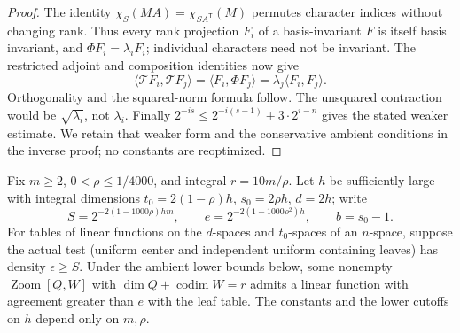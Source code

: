 \begin{proof}
The identity $\chi_S(MA)=\chi_{SA^{\mathsf T}}(M)$ permutes character
indices without changing rank. Thus every rank projection $F_i$ of a
basis-invariant $F$ is itself basis invariant, and
$\Phi F_i=\lambda_iF_i$; individual characters need not be invariant.
The restricted adjoint and composition identities now give
\[
 \langle\mathcal TF_i,\mathcal TF_j\rangle
 =\langle F_i,\Phi F_j\rangle
 =\lambda_j\langle F_i,F_j\rangle.
\]
Orthogonality and the squared-norm formula follow. The unsquared
contraction would be $\sqrt{\lambda_i}$, not $\lambda_i$.
Finally $2^{-is}\le2^{-i(s-1)}+3\cdot2^{i-n}$ gives the stated
weaker estimate. We retain that weaker form and the conservative
ambient conditions in the inverse proof; no constants are reoptimized.
\end{proof}

\begin{lemma}\label{lem:inverse-explicit}
Fix $m\ge2$, $0<\rho\le1/4000$, and integral $r=10m/\rho$.
Let $h$ be sufficiently large with integral dimensions
$t_0=2(1-\rho)h$, $s_0=2\rho h$, $d=2h$; write
\[
 S=2^{-2(1-1000\rho)hm},\qquad
 e=2^{-2(1-1000\rho^2)h},\qquad b=s_0-1.
\]
For tables of linear functions on the $d$-spaces and $t_0$-spaces
of an $n$-space, suppose the actual test (uniform center and independent
uniform containing leaves) has density $\epsilon\ge S$.
Under the ambient lower bounds below, some nonempty
$\operatorname{Zoom}[Q,W]$ with
$\dim Q+\operatorname{codim}W=r$ admits a linear function with
agreement greater than $e$ with the leaf table.
The constants and the lower cutoffs on $h$ depend only on $m,\rho$.
\end{lemma}
